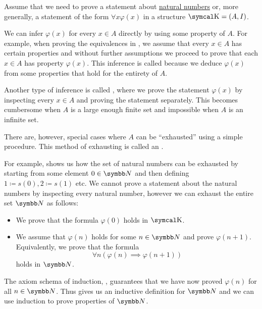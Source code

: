 \begin{remark}\label{remark:induction}
  Assume that we need to prove a statement about \hyperref[def:natural_numbers]{natural numbers} or, more generally, a statement of the form \( \forall x \varphi(x) \) in a structure \( \CK = (A, I) \).

  We can infer \( \varphi(x) \) for every \( x \in A \) directly by using some property of \( A \). For example, when proving the equivalences in , we assume that every \( x \in A \) has certain properties and without further assumptions we proceed to prove that each \( x \in A \) has property \( \varphi(x) \). This inference is called  because we deduce \( \varphi(x) \) from some properties that hold for the entirety of \( A \).

  Another type of inference is called , where we prove the statement \( \varphi(x) \) by inspecting every \( x \in A \) and proving the statement separately. This becomes cumbersome when \( A \) is a large enough finite set and impossible when \( A \) is an infinite set.

  There are, however, special cases where \( A \) can be \enquote{exhausted} using a simple procedure. This method of exhausting is called an .

  For example,  shows us how the set of natural numbers can be exhausted by starting from some element \( 0 \in \BN \) and then defining \( 1 \coloneqq s(0), 2 \coloneqq s(1) \) etc. We cannot prove a statement about the natural numbers by inspecting every natural number, however we can exhaust the entire set \( \BN \) as follows:
  \begin{itemize}
    \item We prove that the formula \( \varphi(0) \) holds in \( \CK \).
    \item We assume that \( \varphi(n) \) holds for some \( n \in \BN \) and prove \( \varphi(n + 1) \). Equivalently, we prove that the formula
          \begin{equation*}
            \forall n (\varphi(n) \implies \varphi(n + 1))
          \end{equation*}
          holds in \( \BN \).
  \end{itemize}

  The axiom schema of induction, , guarantees that we have now proved \( \varphi(n) \) for all \( n \in \BN \). Thus  gives us an inductive definition for \( \BN \) and we can use induction to prove properties of \( \BN \).


\end{remark}
